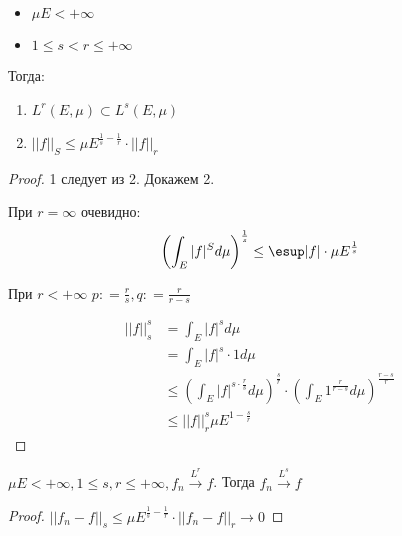 \begin{theorem}\itemfix
    \begin{itemize}
        \item \(\mu E < +\infty\)
        \item \(1 \leq s < r \leq +\infty\)
    \end{itemize}

    Тогда:
    \begin{enumerate}
        \item \(L^r(E, \mu) \subset L^s(E, \mu)\)
        \item \(||f||_S \leq \mu E^{\frac{1}{s} - \frac{1}{r}} \cdot ||f||_r\)
    \end{enumerate}
\end{theorem}
\begin{proof}
    1 следует из 2. Докажем 2.

    При \(r = \infty\) очевидно:
    \[\left(\int_E |f|^S d\mu \right)^{\frac{1}{s}} \leq \esup |f| \cdot \mu E^{\frac{1}{s}}\]

    При \(r < +\infty\) \(p : = \frac{r}{s}, q : = \frac{r}{r - s}\)

    \begin{align*}
        ||f||_s^s & = \int_E |f|^s d\mu                                                                                                                             \\
                  & = \int_E |f|^s \cdot 1 d\mu                                                                                                                     \\
                  & \leq \left( \int_E |f|^{s \cdot \frac{r}{s}} d\mu \right)^{\frac{s}{r}} \cdot \left( \int_E 1^{\frac{r}{r - s}} d\mu \right)^{\frac{r - s}{r} } \\
                  & \leq ||f||_r^s \mu E^{1 - \frac{s}{r}}
    \end{align*}
\end{proof}
\begin{corollary}
    \(\mu E < +\infty, 1 \leq s, r \leq +\infty, f_n \xrightarrow{L^r} f\). Тогда \(f_n \xrightarrow{L^s} f\)
\end{corollary}
\begin{proof}
    \(||f_n - f||_s \leq \mu E^{\frac{1}{s} - \frac{1}{r}} \cdot ||f_n - f||_r \to 0\)
\end{proof}

